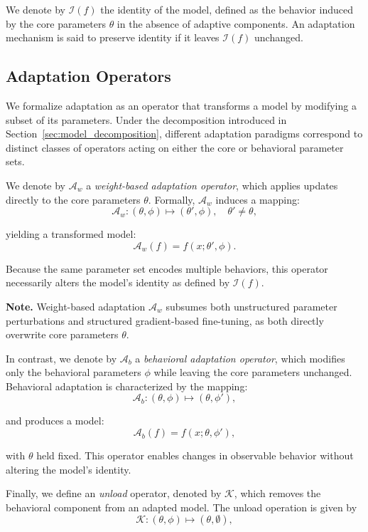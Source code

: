 \documentclass[10pt]{article}
\begin{document}
	We denote by $\mathcal{I}(f)$ the identity of the model, defined as the behavior induced by the core parameters $\theta$ in the absence of adaptive components. An adaptation mechanism is said to preserve identity if it leaves $\mathcal{I}(f)$ unchanged.
	
	\subsection{Adaptation Operators}
	\label{sec:adaptation_operators}
	
	We formalize adaptation as an operator that transforms a model by modifying a subset of its parameters. Under the decomposition introduced in Section~\ref{sec:model_decomposition}, different adaptation paradigms correspond to distinct classes of operators acting on either the core or behavioral parameter sets.
	
	We denote by $\mathcal{A}_w$ a \emph{weight-based adaptation operator}, which applies updates directly to the core parameters $\theta$. Formally, $\mathcal{A}_w$ induces a mapping:
	\[
	\mathcal{A}_w : (\theta,\phi) \mapsto (\theta',\phi), \quad \theta' \neq \theta,
	\]
	
	yielding a transformed model:
	\[
	\mathcal{A}_w(f) = f(x;\theta',\phi).
	\]
	
	Because the same parameter set encodes multiple behaviors, this operator necessarily alters the model’s identity as defined by $\mathcal{I}(f)$.  
	
	\noindent\textbf{Note.} Weight-based adaptation $\mathcal{A}_w$ subsumes both unstructured parameter perturbations and structured gradient-based fine-tuning, as both directly overwrite core parameters $\theta$.
	
	In contrast, we denote by $\mathcal{A}_b$ a \emph{behavioral adaptation operator}, which modifies only the behavioral parameters $\phi$ while leaving the core parameters unchanged. Behavioral adaptation is characterized by the mapping:
	\[
	\mathcal{A}_b : (\theta,\phi) \mapsto (\theta,\phi'),
	\]
	
	and produces a model:
	\[
	\mathcal{A}_b(f) = f(x;\theta,\phi'),
	\]
	
	with $\theta$ held fixed. This operator enables changes in observable behavior without altering the model’s identity.
	
	Finally, we define an \emph{unload} operator, denoted by $\mathcal{K}$, which removes the behavioral component from an adapted model. The unload operation is given by
	\[
	\mathcal{K} : (\theta,\phi) \mapsto (\theta,\emptyset),
	\]
	
\end{document}
